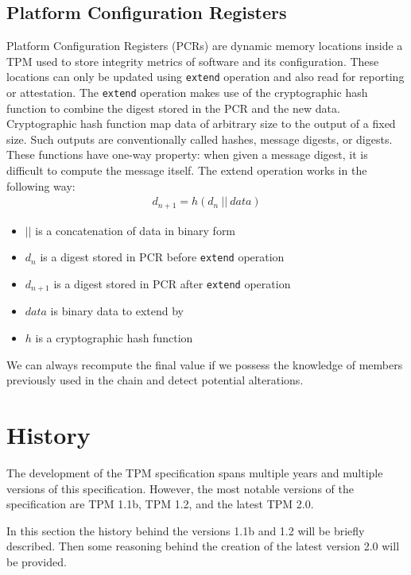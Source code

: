 \subsection{Platform Configuration Registers}\label{sec:pcr}
Platform Configuration Registers (PCRs) are dynamic memory locations inside a TPM used to store integrity metrics of software and its configuration. These locations can only be updated using \texttt{extend} operation and also read for reporting or attestation. The \texttt{extend} operation makes use of the cryptographic hash function to combine the digest stored in the PCR and the new data. Cryptographic hash function map data of arbitrary size to the output of a fixed size. Such outputs are conventionally called hashes, message digests, or digests. These functions have one-way property: when given a message digest, it is difficult  to compute the message itself. The extend operation works in the following way:
\begin{align*}
    d_{n+1} = h(d_{n}\ ||\ data)
\end{align*}
\begin{itemize}
    \item $||$ is a concatenation of data in binary form
    \item $ d_{n} $ is a digest stored in PCR before \texttt{extend} operation
    \item $ d_{n+1} $ is a digest stored in PCR after \texttt{extend} operation
    \item $ data $ is binary data to extend by
    \item $ h $ is a cryptographic hash function
\end{itemize}

We can always recompute the final value if we possess the knowledge of members previously used in the chain and detect potential alterations.


\section{History}
The development of the TPM specification spans multiple years and multiple versions of this specification. However, the most notable versions of the specification are TPM 1.1b, TPM 1.2, and the latest TPM 2.0. 

In this section the history behind the versions 1.1b and 1.2 will be briefly described. Then some reasoning behind the creation of the latest version 2.0 will be provided.

